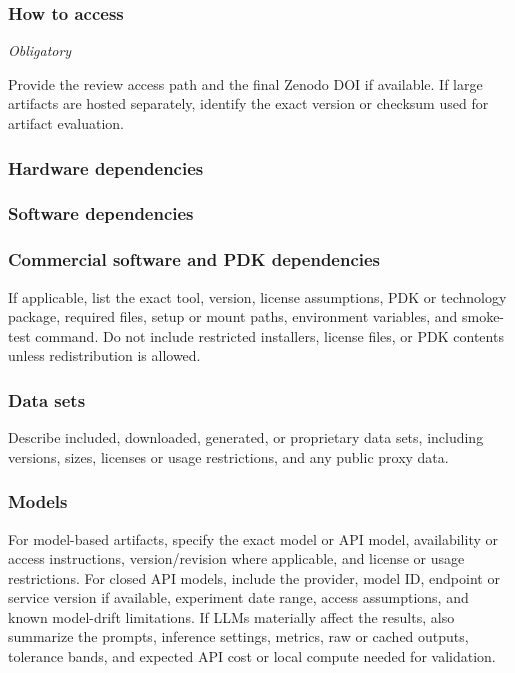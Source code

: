 \documentclass{sigplanconf}
\begin{document}
\subsubsection{How to access}

{\em Obligatory}

Provide the review access path and the final Zenodo DOI if available. If large
artifacts are hosted separately, identify the exact version or checksum used
for artifact evaluation.

\subsubsection{Hardware dependencies}

\subsubsection{Software dependencies}

\subsubsection{Commercial software and PDK dependencies}

If applicable, list the exact tool, version, license assumptions, PDK or
technology package, required files, setup or mount paths, environment variables,
and smoke-test command. Do not include restricted installers, license files, or
PDK contents unless redistribution is allowed.

\subsubsection{Data sets}

Describe included, downloaded, generated, or proprietary data sets, including
versions, sizes, licenses or usage restrictions, and any public proxy data.

\subsubsection{Models}

For model-based artifacts, specify the exact model or API model, availability
or access instructions, version/revision where applicable, and license or usage
restrictions. For closed API models, include the provider, model ID, endpoint or
service version if available, experiment date range, access assumptions, and
known model-drift limitations. If LLMs materially affect the results, also
summarize the prompts, inference settings, metrics, raw or cached outputs,
tolerance bands, and expected API cost or local compute needed for validation.
\end{document}
